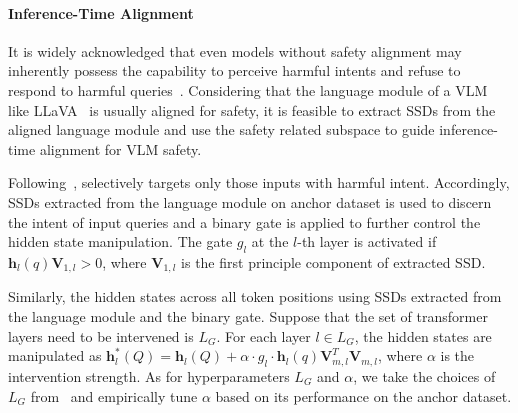 


\paragraph{Inference-Time Alignment}

It is widely acknowledged that even models without safety alignment may inherently possess the capability to perceive harmful intents and refuse to respond to harmful queries~\cite{wang2024inferaligner,zheng2024prompt,lin2023unlocking}. Considering that the language module of a VLM like LLaVA~\cite{liu2024visual,liu2024improved} is usually aligned for safety, it is feasible to extract SSDs from the aligned language module and use the safety related subspace to guide inference-time alignment for VLM safety.

Following~\citet{wang2024inferaligner}, \MODEL selectively targets only those inputs with harmful intent. Accordingly, SSDs extracted from the language module on anchor dataset is used to discern the intent of input queries and a binary gate is applied to further control the hidden state manipulation. The gate $g_l$ at the $l$-th layer is activated if $\mathbf{h}_l(q) \mathbf{V}_{1, l} > 0$, where $\mathbf{V}_{1, l}$ is the first principle component of extracted SSD.

Similarly, the hidden states across all token positions using SSDs extracted from the language module and the binary gate. Suppose that the set of transformer layers need to be intervened is $L_G$. For each layer $l \in L_G$, the hidden states are manipulated as 
$\mathbf{h}_l^*(Q) = \mathbf{h}_l(Q) + \alpha \cdot g_l \cdot \mathbf{h}_l(q) \mathbf{V}_{m, l} ^T \mathbf{V}_{m, l}$,
where  $\alpha$ is the intervention strength. 
As for hyperparameters $L_G$ and $\alpha$, we take the choices of $L_G$ from~\citet{wang2024inferaligner} and empirically tune $\alpha$ based on its performance on the anchor dataset.



